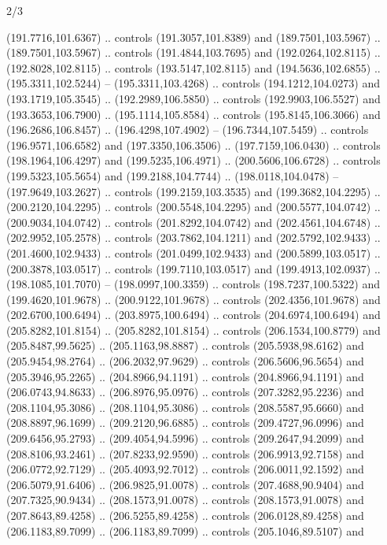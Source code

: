\begin{flagdescription}{2/3}
\begin{scope}[xshift=0.5\flaglength,yshift=0.5\flagwidth,scale=\flagwidth/180]
\begin{scope}[y=0.8pt, x=0.8pt, yscale=-1,shift={(-168.75,-108.75)}]
  (191.7716,101.6367) .. controls (191.3057,101.8389) and (189.7501,103.5967) ..
  (189.7501,103.5967) .. controls (191.4844,103.7695) and (192.0264,102.8115) ..
  (192.8028,102.8115) .. controls (193.5147,102.8115) and (194.5636,102.6855) ..
  (195.3311,102.5244) -- (195.3311,103.4268) .. controls (194.1212,104.0273) and
  (193.1719,105.3545) .. (192.2989,106.5850) .. controls (192.9903,106.5527) and
  (193.3653,106.7900) .. (195.1114,105.8584) .. controls (195.8145,106.3066) and
  (196.2686,106.8457) .. (196.4298,107.4902) -- (196.7344,107.5459) .. controls
  (196.9571,106.6582) and (197.3350,106.3506) .. (197.7159,106.0430) .. controls
  (198.1964,106.4297) and (199.5235,106.4971) .. (200.5606,106.6728) .. controls
  (199.5323,105.5654) and (199.2188,104.7744) .. (198.0118,104.0478) --
  (197.9649,103.2627) .. controls (199.2159,103.3535) and (199.3682,104.2295) ..
  (200.2120,104.2295) .. controls (200.5548,104.2295) and (200.5577,104.0742) ..
  (200.9034,104.0742) .. controls (201.8292,104.0742) and (202.4561,104.6748) ..
  (202.9952,105.2578) .. controls (203.7862,104.1211) and (202.5792,102.9433) ..
  (201.4600,102.9433) .. controls (201.0499,102.9433) and (200.5899,103.0517) ..
  (200.3878,103.0517) .. controls (199.7110,103.0517) and (199.4913,102.0937) ..
  (198.1085,101.7070) -- (198.0997,100.3359) .. controls (198.7237,100.5322) and
  (199.4620,101.9678) .. (200.9122,101.9678) .. controls (202.4356,101.9678) and
  (202.6700,100.6494) .. (203.8975,100.6494) .. controls (204.6974,100.6494) and
  (205.8282,101.8154) .. (205.8282,101.8154) .. controls (206.1534,100.8779) and
  (205.8487,99.5625) .. (205.1163,98.8887) .. controls (205.5938,98.6162) and
  (205.9454,98.2764) .. (206.2032,97.9629) .. controls (206.5606,96.5654) and
  (205.3946,95.2265) .. (204.8966,94.1191) .. controls (204.8966,94.1191) and
  (206.0743,94.8633) .. (206.8976,95.0976) .. controls (207.3282,95.2236) and
  (208.1104,95.3086) .. (208.1104,95.3086) .. controls (208.5587,95.6660) and
  (208.8897,96.1699) .. (209.2120,96.6885) .. controls (209.4727,96.0996) and
  (209.6456,95.2793) .. (209.4054,94.5996) .. controls (209.2647,94.2099) and
  (208.8106,93.2461) .. (207.8233,92.9590) .. controls (206.9913,92.7158) and
  (206.0772,92.7129) .. (205.4093,92.7012) .. controls (206.0011,92.1592) and
  (206.5079,91.6406) .. (206.9825,91.0078) .. controls (207.4688,90.9404) and
  (207.7325,90.9434) .. (208.1573,91.0078) .. controls (208.1573,91.0078) and
  (207.8643,89.4258) .. (206.5255,89.4258) .. controls (206.0128,89.4258) and
  (206.1183,89.7099) .. (206.1183,89.7099) .. controls (205.1046,89.5107) and

\end{scope}
\end{scope}
\end{flagdescription}
